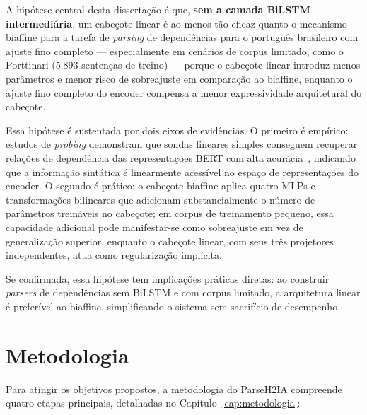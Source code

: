 A hipótese central desta dissertação é que, \textbf{sem a camada BiLSTM intermediária},
um cabeçote linear é ao menos tão eficaz quanto o mecanismo biaffine para a tarefa de
\textit{parsing} de dependências para o português brasileiro com ajuste fino completo —
especialmente em cenários de corpus limitado, como o Porttinari (5.893 sentenças de treino)
— porque o cabeçote linear introduz menos parâmetros e menor risco de sobreajuste em
comparação ao biaffine, enquanto o ajuste fino completo do encoder compensa a menor
expressividade arquitetural do cabeçote.

Essa hipótese é sustentada por dois eixos de evidências. O primeiro é empírico: estudos de
\textit{probing} demonstram que sondas lineares simples conseguem recuperar relações de
dependência das representações BERT com alta acurácia~\citep{hewitt2019structural}, indicando
que a informação sintática é linearmente acessível no espaço de representações do encoder.
O segundo é prático: o cabeçote biaffine aplica quatro MLPs e transformações bilineares que
adicionam substancialmente o número de parâmetros treináveis no cabeçote; em corpus de
treinamento pequeno, essa capacidade adicional pode manifestar-se como sobreajuste em vez de
generalização superior, enquanto o cabeçote linear, com seus três projetores independentes,
atua como regularização implícita.

Se confirmada, essa hipótese tem implicações práticas diretas: ao construir \textit{parsers}
de dependências sem BiLSTM e com corpus limitado, a arquitetura linear é preferível ao biaffine,
simplificando o sistema sem sacrifício de desempenho.

\section{Metodologia}
\label{sec:metodologia_intro}

Para atingir os objetivos propostos, a metodologia do ParseH2IA compreende quatro etapas
principais, detalhadas no Capítulo~\ref{cap:metodologia}:

